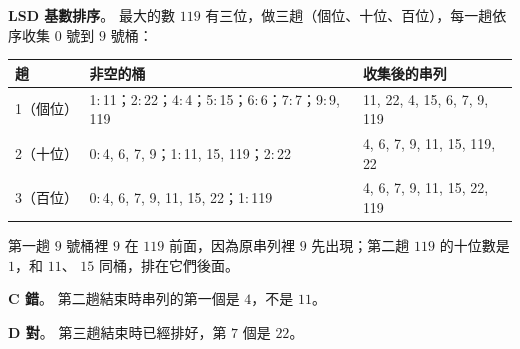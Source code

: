 \begin{pastsoln}
\textbf{LSD 基數排序}。 最大的數 $119$ 有三位，做三趟（個位、十位、百位），每一趟依序收集
$0$ 號到 $9$ 號桶：
\begin{center}
\small
\begin{tabular}{lll}
\toprule
趟 & 非空的桶 & 收集後的串列 \\
\midrule
1（個位）& 1:\,11；2:\,22；4:\,4；5:\,15；6:\,6；7:\,7；9:\,9, 119 & 11, 22, 4, 15, 6, 7, 9, 119 \\
2（十位）& 0:\,4, 6, 7, 9；1:\,11, 15, 119；2:\,22 & 4, 6, 7, 9, 11, 15, 119, 22 \\
3（百位）& 0:\,4, 6, 7, 9, 11, 15, 22；1:\,119 & 4, 6, 7, 9, 11, 15, 22, 119 \\
\bottomrule
\end{tabular}
\end{center}
第一趟 $9$ 號桶裡 $9$ 在 $119$ 前面，因為原串列裡 $9$ 先出現；第二趟 $119$ 的十位數是 $1$，和 $11$、
$15$ 同桶，排在它們後面。

\textbf{C 錯}。 第二趟結束時串列的第一個是 $4$，不是 $11$。

\textbf{D 對}。 第三趟結束時已經排好，第 $7$ 個是 $22$。
\end{pastsoln}
